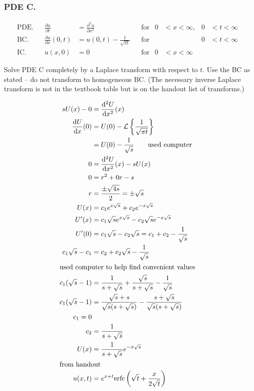 \documentclass{article}
\begin{document}
\subsubsection*{PDE C.}
\begin{align*}
  \text{PDE.}&&\frac{\partial u}{\partial t}&=\frac{\partial^2u}{\partial x^2}&&\text{for}&0&<x<\infty,&0&<t<\infty\\
  \text{BC.}&&\frac{\partial u}{\partial x}(0,t)&=u(0,t)-\frac{1}{\sqrt{\pi t}}&&\text{for}&&&0&<t<\infty\\
  \text{IC.}&&u(x,0)&=0&&\text{for}&0&<x<\infty
\end{align*}

Solve PDE C completely by a Laplace transform with respect to $t$. Use the BC as stated -- do not transform to homogeneous BC. (The necessary inverse Laplace transform is not in the textbook table but is on the handout list of transforms.)

\begin{align*}
  sU(x)-0&=\frac{\mathrm{d}^2U}{\mathrm{d}x^2}(x)\\
  \frac{\mathrm{d}U}{\mathrm{d}x}(0)&=U(0)-\mathcal{L}\left\{\frac{1}{\sqrt{\pi t}}\right\}\\
  &=U(0)-\frac{1}{\sqrt{s}}\qquad\text{used computer}\\
  0&=\frac{\mathrm{d}^2U}{\mathrm{d}x^2}(x)-sU(x)\\
  0&=r^2+0r-s\\
  r&=\frac{\pm\sqrt{4s}}{2}=\pm\sqrt{s}\\
  U(x)&=c_1e^{x\sqrt{s}}+c_2e^{-x\sqrt{s}}\\
  U'(x)&=c_1\sqrt{s}e^{x\sqrt{s}}-c_2\sqrt{s}e^{-x\sqrt{s}}\\
  U'(0)&=c_1\sqrt{s}-c_2\sqrt{s}=c_1+c_2-\frac{1}{\sqrt{s}}\\
  c_1\sqrt{s}-c_1&=c_2+c_2\sqrt{s}-\frac{1}{\sqrt{s}}\\
  \intertext{used computer to help find convenient values}
  c_1(\sqrt{s}-1)&=\frac{1}{s+\sqrt{s}}+\frac{\sqrt{s}}{s+\sqrt{s}}-\frac{1}{\sqrt{s}}\\
  c_1(\sqrt{s}-1)&=\frac{\sqrt{s}+s}{\sqrt{s}(s+\sqrt{s})}-\frac{s+\sqrt{s}}{\sqrt{s}(s+\sqrt{s})}\\
  c_1=0\\
  c_2&=\frac{1}{s+\sqrt{s}}\\
  U(x)&=\frac{1}{s+\sqrt{s}}e^{-x\sqrt{s}}\\
  \intertext{from handout}
  u(x,t)&=e^{x+t}\text{erfc}\left(\sqrt{t}+\frac{x}{2\sqrt{t}}\right)
\end{align*}
\end{document}
